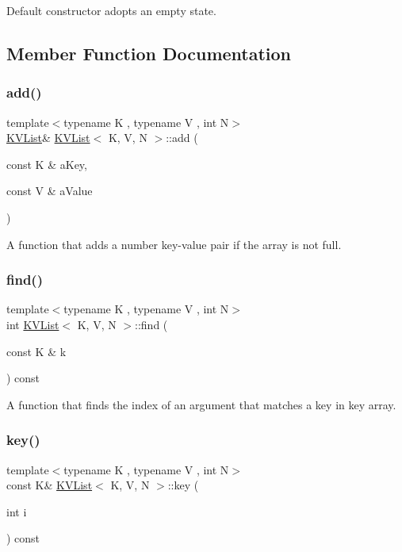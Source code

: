 Default constructor adopts an empty state. 

\subsection{Member Function Documentation}
\mbox{\label{classKVList_ab0604395c2c4063eb1bab61983f018a9}} 
\subsubsection{\texorpdfstring{add()}{add()}}
{\footnotesize\ttfamily template$<$typename K , typename V , int N$>$ \\
\mbox{\hyperlink{classKVList}{K\+V\+List}}\& \mbox{\hyperlink{classKVList}{K\+V\+List}}$<$ K, V, N $>$\+::add (\begin{DoxyParamCaption}\item[{const K \&}]{a\+Key,  }\item[{const V \&}]{a\+Value }\end{DoxyParamCaption})\hspace{0.3cm}{\ttfamily [inline]}}

A function that adds a number key-\/value pair if the array is not full. \mbox{\label{classKVList_aef6e6bcc30e6436b2ad957f3efcfb822}} 
\subsubsection{\texorpdfstring{find()}{find()}}
{\footnotesize\ttfamily template$<$typename K , typename V , int N$>$ \\
int \mbox{\hyperlink{classKVList}{K\+V\+List}}$<$ K, V, N $>$\+::find (\begin{DoxyParamCaption}\item[{const K \&}]{k }\end{DoxyParamCaption}) const\hspace{0.3cm}{\ttfamily [inline]}}

A function that finds the index of an argument that matches a key in key array. \mbox{\label{classKVList_ad1abbfbdef9b9f7f79ed30cd259bc2c9}} 
\subsubsection{\texorpdfstring{key()}{key()}}
{\footnotesize\ttfamily template$<$typename K , typename V , int N$>$ \\
const K\& \mbox{\hyperlink{classKVList}{K\+V\+List}}$<$ K, V, N $>$\+::key (\begin{DoxyParamCaption}\item[{int}]{i }\end{DoxyParamCaption}) const\hspace{0.3cm}{\ttfamily [inline]}}

